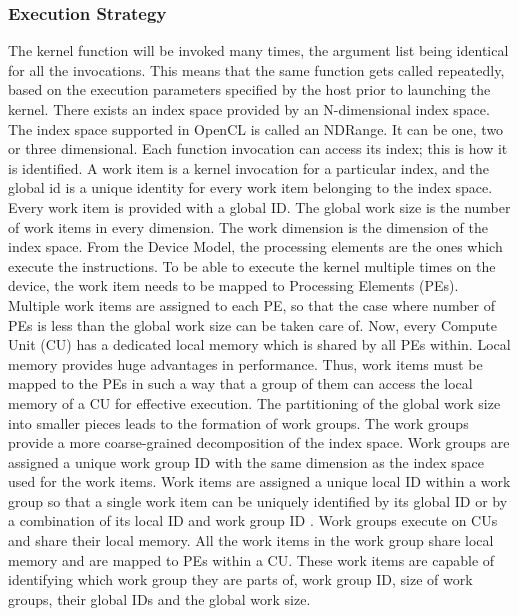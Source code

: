 \subsubsection{Execution Strategy}
The kernel function will be invoked many times, the argument list being identical for all the invocations. This means that the same function gets called repeatedly, based on the execution parameters specified by the host prior to launching the kernel.\newline\newline
There exists an index space provided by an N-dimensional index space. The index space supported in OpenCL is called an NDRange. It can be one, two or three dimensional. Each function invocation can access its index; this is how it is identified. A work item is a kernel invocation for a particular index, and the global id is a unique identity for every work item belonging to the index space. Every work item is provided with a global ID. The global work size is the number of work items in every dimension. The work dimension is the dimension of the index space.\newline\newline 
From the Device Model, the processing elements are the ones which execute the instructions. To be able to execute the kernel multiple times on the device, the work item needs to be mapped to Processing Elements (PEs). Multiple work items are assigned to each PE, so that the case where number of PEs is less than the global work size can be taken care of. \newline\newline
Now, every Compute Unit (CU) has a dedicated local memory which is shared by all PEs within. Local memory provides huge advantages in performance. Thus, work items must be mapped to the PEs in such a way that a group of them can access the local memory of a CU for effective execution. The partitioning of the global work size into smaller pieces leads to the formation of work groups. The work groups provide a more coarse-grained decomposition of the index space. Work groups are assigned a unique work group ID with the same dimension as the index space used for the work items. Work items are assigned a unique local ID within a work group so that a single work item can be uniquely identified by its global ID or by a combination of its local ID and work group ID \cite{opencl_khronos}. \newline\newline
Work groups execute on CUs and share their local memory. All the work items in the work group share local memory and are mapped to PEs within a CU. These work items are capable of identifying which work group they are parts of, work group ID, size of work groups, their global IDs and the global work size. \newline\newline 
